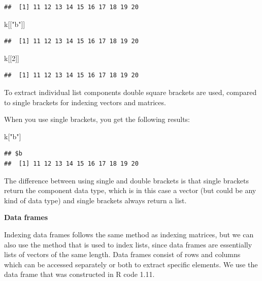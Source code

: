 \documentclass[
]{book}
\newenvironment{Shaded}{\begin{snugshade}}{\end{snugshade}}
\newcommand{\DecValTok}[1]{\textcolor[rgb]{0.00,0.00,0.81}{#1}}
\newcommand{\NormalTok}[1]{#1}
\newcommand{\StringTok}[1]{\textcolor[rgb]{0.31,0.60,0.02}{#1}}
\begin{document}
\begin{verbatim}
##  [1] 11 12 13 14 15 16 17 18 19 20
\end{verbatim}

\begin{Shaded}
\begin{Highlighting}[]
\NormalTok{k[[}\StringTok{"b"}\NormalTok{]]}
\end{Highlighting}
\end{Shaded}

\begin{verbatim}
##  [1] 11 12 13 14 15 16 17 18 19 20
\end{verbatim}

\begin{Shaded}
\begin{Highlighting}[]
\NormalTok{k[[}\DecValTok{2}\NormalTok{]]}
\end{Highlighting}
\end{Shaded}

\begin{verbatim}
##  [1] 11 12 13 14 15 16 17 18 19 20
\end{verbatim}

To extract individual list components double square brackets are used, compared to single brackets for indexing vectors and matrices.

When you use single brackets, you get the following results:

\begin{Shaded}
\begin{Highlighting}[]
\NormalTok{k[}\StringTok{"b"}\NormalTok{]}
\end{Highlighting}
\end{Shaded}

\begin{verbatim}
## $b
##  [1] 11 12 13 14 15 16 17 18 19 20
\end{verbatim}

The difference between using single and double brackets is that single brackets return the component data type, which is in this case a vector (but could be any kind of data type) and single brackets always return a list.

\textbf{Data frames}

Indexing data frames follows the same method as indexing matrices, but we can also use the method that is used to index lists, since data frames are essentially lists of vectors of the same length. Data frames consist of rows and columns which can be accessed separately or both to extract specific elements. We use the data frame that was constructed in R code 1.11.
\end{document}
